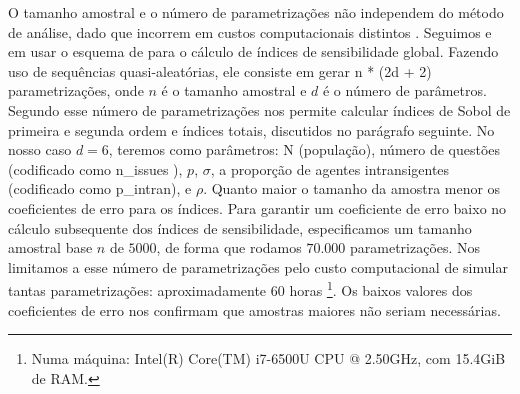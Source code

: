 O tamanho amostral e o número de parametrizações não independem do método de
análise, dado que incorrem em custos computacionais distintos
\cite{saltelli2002making}. Seguimos  e
 em usar o esquema de
 para o cálculo de índices de sensibilidade
global. Fazendo uso de sequências quasi-aleatórias, ele consiste em gerar n *
(2d + 2) parametrizações, onde \(n\) é o tamanho amostral e \(d\) é o número de
parâmetros. Segundo  esse número de
parametrizações nos permite calcular índices de Sobol de primeira e segunda
ordem e índices totais, discutidos no parágrafo seguinte. No nosso caso \(d =
6\), teremos como parâmetros: N (população), número de questões (codificado como
n\_issues ), \(p\), \(\sigma\), a proporção de agentes intransigentes
(codificado como p\_intran), e \(\rho\). Quanto maior o tamanho da amostra menor
os coeficientes de erro para os índices. Para garantir um coeficiente de erro
baixo no cálculo subsequente dos índices de sensibilidade, especificamos um
tamanho amostral base \(n\) de \(5000\), de forma que rodamos \(70.000\)
parametrizações. Nos limitamos a esse número de parametrizações pelo custo
computacional de simular tantas parametrizações: aproximadamente 60 horas
\footnote{Numa máquina: Intel(R) Core(TM) i7-6500U CPU @ 2.50GHz, com 15.4GiB de
  RAM.}. Os baixos valores dos coeficientes de erro nos confirmam que amostras
maiores não seriam necessárias.


